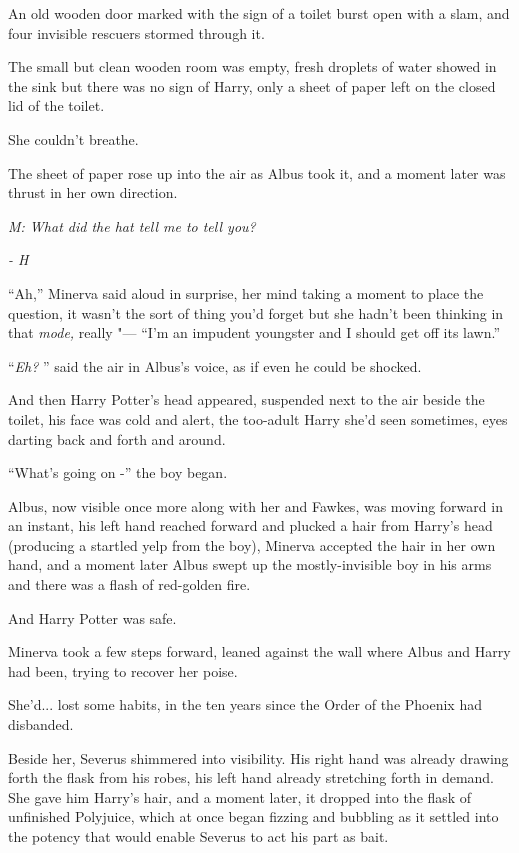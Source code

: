 An old wooden door marked with the sign of a toilet burst open with a
slam, and four invisible rescuers stormed through it.

The small but clean wooden room was empty, fresh droplets of water
showed in the sink but there was no sign of Harry, only a sheet of paper
left on the closed lid of the toilet.

She couldn't breathe.

The sheet of paper rose up into the air as Albus took it, and a moment
later was thrust in her own direction.

\emph{M: What did the hat tell me to tell you?}

\emph{- H}

``Ah,'' Minerva said aloud in surprise, her mind taking a moment to
place the question, it wasn't the sort of thing you'd forget but she
hadn't been thinking in that \emph{mode,} really "--- ``I'm an impudent
youngster and I should get off its lawn.''

``\emph{Eh?} '' said the air in Albus's voice, as if even he could be
shocked.

And then Harry Potter's head appeared, suspended next to the air beside
the toilet, his face was cold and alert, the too-adult Harry she'd seen
sometimes, eyes darting back and forth and around.

``What's going on -'' the boy began.

Albus, now visible once more along with her and Fawkes, was moving
forward in an instant, his left hand reached forward and plucked a hair
from Harry's head (producing a startled yelp from the boy), Minerva
accepted the hair in her own hand, and a moment later Albus swept up the
mostly-invisible boy in his arms and there was a flash of red-golden
fire.

And Harry Potter was safe.

Minerva took a few steps forward, leaned against the wall where Albus
and Harry had been, trying to recover her poise.

She'd... lost some habits, in the ten years since the Order of the
Phoenix had disbanded.

Beside her, Severus shimmered into visibility. His right hand was
already drawing forth the flask from his robes, his left hand already
stretching forth in demand. She gave him Harry's hair, and a moment
later, it dropped into the flask of unfinished Polyjuice, which at once
began fizzing and bubbling as it settled into the potency that would
enable Severus to act his part as bait.


